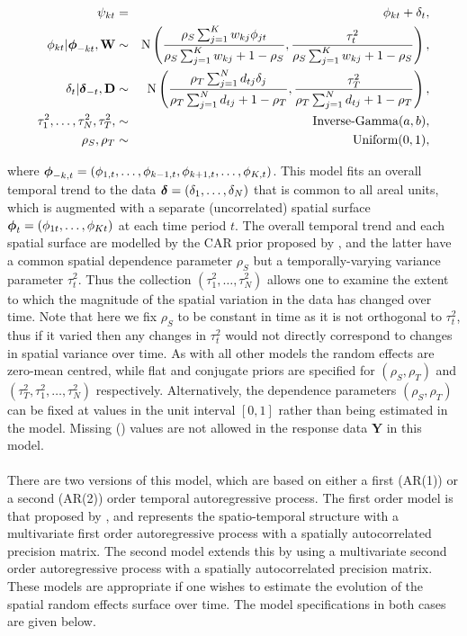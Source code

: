 \documentclass[article, nojss]{jss}
\newcommand{\bd}[1]{\ensuremath{\mbox{\boldmath $#1$}}}
\begin{document}
\begin{eqnarray}
\psi_{kt}&=&\phi_{kt} +  \delta_t,\label{carsepspat}\\
\phi_{kt}|\bd{\phi}_{-kt},\mathbf{W}&\sim&\mbox{N}\left(\frac{\rho_{S}\sum_{j=1}^Kw_{kj}\phi_{jt}}{\rho_{S}\sum_{j=1}^Kw_{kj} + 1-\rho_{S}}, \frac{\tau^2_{t}}{\rho_{S}\sum_{j=1}^Kw_{kj} + 1-\rho_{S}}\right),\nonumber\\
\delta_t|\bd{\delta}_{-t},\mathbf{D}&\sim&\mbox{N}\left(\frac{\rho_{T}\sum_{j=1}^N d_{tj}\delta_j}{\rho_{T}\sum_{j=1}^N d_{tj} + 1-\rho_{T}}, \frac{\tau^2_{T}}{\rho_{T}\sum_{j=1}^N d_{tj}+1-\rho_{T}}\right),\nonumber\\
\tau^2_{1},\ldots, \tau^2_{N}, \tau^2_{T}, &\sim&\mbox{Inverse-Gamma}(a,b),\nonumber\\
\rho_{S}, \rho_{T}&\sim&\mbox{Uniform}(0,1),\nonumber
\end{eqnarray}

where $\bd{\phi}_{-k,t}=(\phi_{1,t},\ldots,\phi_{k-1,t}, \phi_{k+1,t},\ldots,\phi_{K,t})$. This model fits an overall temporal trend to the data $\bd{\delta}=(\delta_1,\ldots,\delta_{N})$ that is common to all areal units, which is augmented with a separate (uncorrelated) spatial surface $\bd{\phi}_t=(\phi_{1t},\ldots, \phi_{Kt})$ at each time period $t$. The overall temporal trend and each spatial surface are modelled by the CAR prior proposed by \cite{leroux2000}, and the latter have a common spatial dependence parameter $\rho_S$ but a temporally-varying variance parameter $\tau^2_{t}$. Thus the collection $(\tau^2_{1},\ldots, \tau^2_{N})$ allows one to examine the extent to which the magnitude of the spatial variation in the data has changed over time. Note that here we fix $\rho_S$ to be constant in time as it is not orthogonal to $\tau^{2}_t$, thus if it varied then any changes in $\tau^{2}_t$ would not directly correspond to changes in spatial variance over time. As with all other models the random effects are zero-mean centred, while flat and conjugate priors are specified for $(\rho_S, \rho_T)$ and $(\tau^2_{T}, \tau^2_{1},\ldots, \tau^2_{N})$ respectively. Alternatively, the  dependence parameters $(\rho_{S}, \rho_{T})$ can be fixed at values in the unit interval $[0,1]$ rather than being estimated in the model. Missing () values are not allowed in the response data $\mathbf{Y}$ in this model.\\




\\
There are two versions of this model, which are based on either a first (AR(1)) or a second (AR(2)) order temporal autoregressive process. The first order model is that proposed by \cite{rushworth2014}, and represents the spatio-temporal structure with a multivariate first order autoregressive process with a spatially autocorrelated precision matrix. The second model extends this by using a multivariate second order autoregressive process with a spatially autocorrelated precision matrix. These models are appropriate if one wishes to estimate the  evolution of the spatial random effects surface over time. The model specifications in both cases are given below.\vspace{0.5cm}
\end{document}
